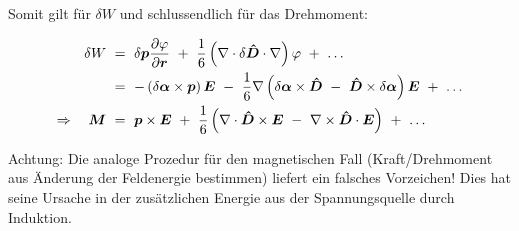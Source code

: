 Somit gilt für $\delta W$ und schlussendlich für das Drehmoment:

\begin{align*}
\delta W  \ &= \  \delta\vec{p} \pdiff{\varphi}{\vec{r}} \ + \ \frac{1}{6}\left(\nabla\cdot\delta\tens{D}\cdot\nabla\right)\varphi \ + \ \ldots\\
&= \ - \left(\delta\vec{\alpha}\times\vec{p}\right)\vec{E} \ - \ \frac{1}{6}\nabla\left(\delta\vec{\alpha}\times\tens{D} \ - \ \tens{D} \times\delta\vec{\alpha}\right)\vec{E} \ +  \ \ldots\\
\Rightarrow\quad \vec{M} \ &= \ \vec{p}\times\vec{E} \ + \ \frac{1}{6}\left(\nabla\cdot\tens{D}\times\vec{E} \ - \ \nabla\times\tens{D}\cdot\vec{E}\right) \ + \ \ldots
\end{align*}

Achtung: Die analoge Prozedur für den magnetischen Fall (Kraft/Drehmoment aus Änderung der Feldenergie bestimmen) liefert ein falsches Vorzeichen! Dies hat seine Ursache in der zusätzlichen Energie aus der Spannungsquelle durch Induktion.